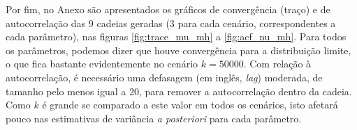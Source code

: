 Por fim, no Anexo são apresentados os gráficos de convergência (traço) e de autocorrelação das 9 cadeias geradas (3 para cada cenário, correspondentes a cada parâmetro), nas figuras \ref{fig:trace_mu_mh} a \ref{fig:acf_nu_mh}. Para todos os parâmetros, podemos dizer que houve convergência para a distribuição limite, o que fica bastante evidentemente no cenário $k = 50000$. Com relação à autocorrelação, é necessário uma defasagem (em inglês, \textit{lag}) moderada, de tamanho pelo menos igual a 20, para remover a autocorrelação dentro da cadeia. Como $k$ é grande se comparado a este valor em todos os cenários, isto afetará pouco nas estimativas de variância \textit{a posteriori} para cada parâmetro.